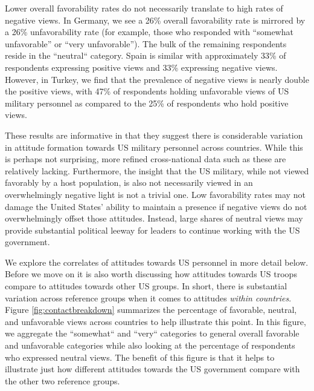 Lower overall favorability rates do not necessarily translate to high rates of negative views. In Germany, we see a 26\% overall favorability rate is mirrored by a 26\% unfavorability rate (for example, those who responded with ``somewhat unfavorable'' or ``very unfavorable''). The bulk of the remaining respondents reside in the ``neutral`` category. Spain is similar with approximately 33\% of respondents expressing positive views and 33\% expressing negative views. However, in Turkey, we find that the prevalence of negative views is nearly double the positive views, with 47\% of respondents holding unfavorable views of US military personnel as compared to the 25\% of respondents who hold positive views.

These results are informative in that they suggest there is considerable variation in attitude formation towards US military personnel across countries. While this is perhaps not surprising, more refined cross-national data such as these are relatively lacking. Furthermore, the insight that the US military, while not viewed favorably by a host population, is also not necessarily viewed in an overwhelmingly negative light is not a trivial one. Low favorability rates may not damage the United States' ability to maintain a presence if negative views do not overwhelmingly offset those attitudes. Instead, large shares of neutral views may provide substantial political leeway for leaders to continue working with the US government.

We explore the correlates of attitudes towards US personnel in more detail below. Before we move on it is also worth discussing how attitudes towards US troops compare to attitudes towards other US groups. In short, there is substantial variation across reference groups when it comes to attitudes \textit{within countries}. Figure \ref{fig:contactbreakdown} summarizes the percentage of favorable, neutral, and unfavorable views across countries to help illustrate this point. In this figure, we aggregate the ``somewhat`` and ``very`` categories to general overall favorable and unfavorable categories while also looking at the percentage of respondents who expressed neutral views. The benefit of this figure is that it helps to illustrate just how different attitudes towards the US government compare with the other two reference groups.

